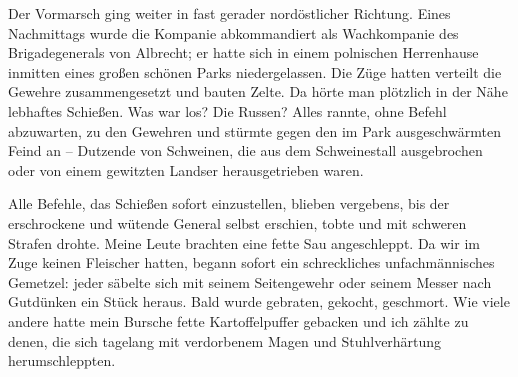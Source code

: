 \documentclass[a5paper,pagesize,10pt,twoside=true]{scrbook}
\begin{document}
Der Vormarsch ging weiter in fast gerader nordöstlicher Richtung. Eines Nachmittags wurde die Kompanie abkommandiert als Wachkompanie des Brigadegenerals von Albrecht; er hatte sich in einem polnischen Herrenhause inmitten eines großen schönen Parks niedergelassen. Die Züge hatten verteilt die Gewehre zusammengesetzt und bauten Zelte. Da hörte man plötzlich in der Nähe lebhaftes Schießen. Was war los? Die Russen? Alles rannte, ohne Befehl abzuwarten, zu den Gewehren und stürmte gegen den im Park ausgeschwärmten Feind an -- Dutzende von Schweinen, die aus dem Schweinestall ausgebrochen oder von einem gewitzten Landser herausgetrieben waren.

Alle Befehle, das Schießen sofort einzustellen, blieben vergebens, bis der erschrockene und wütende General selbst erschien, tobte und mit schweren Strafen drohte. Meine Leute brachten eine fette Sau angeschleppt. Da wir im Zuge keinen Fleischer hatten, begann sofort ein schreckliches unfachmännisches Gemetzel: jeder säbelte sich mit seinem Seitengewehr oder seinem Messer nach Gutdünken ein Stück heraus. Bald wurde gebraten, gekocht, geschmort. Wie viele andere hatte mein Bursche fette Kartoffelpuffer gebacken und ich zählte zu denen, die sich tagelang mit verdorbenem Magen und Stuhlverhärtung herumschleppten.
\end{document}
